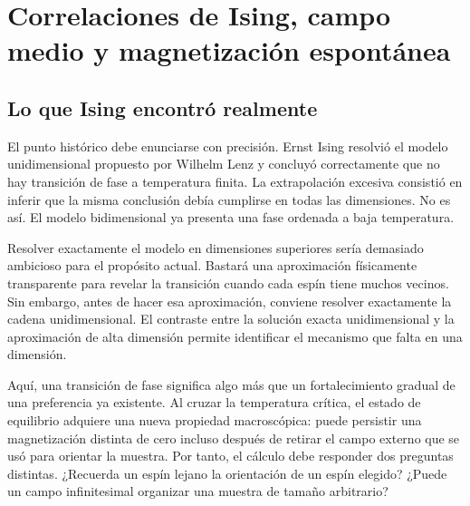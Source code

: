 \chapter{Correlaciones de Ising, campo medio y magnetización espontánea}


\section{Lo que Ising encontró realmente}

El punto histórico debe enunciarse con precisión. Ernst Ising resolvió el modelo unidimensional propuesto por Wilhelm Lenz y concluyó correctamente que no hay transición de fase a temperatura finita. La extrapolación excesiva consistió en inferir que la misma conclusión debía cumplirse en todas las dimensiones. No es así. El modelo bidimensional ya presenta una fase ordenada a baja temperatura.

Resolver exactamente el modelo en dimensiones superiores sería demasiado ambicioso para el propósito actual. Bastará una aproximación físicamente transparente para revelar la transición cuando cada espín tiene muchos vecinos. Sin embargo, antes de hacer esa aproximación, conviene resolver exactamente la cadena unidimensional. El contraste entre la solución exacta unidimensional y la aproximación de alta dimensión permite identificar el mecanismo que falta en una dimensión.

Aquí, una transición de fase significa algo más que un fortalecimiento gradual de una preferencia ya existente. Al cruzar la temperatura crítica, el estado de equilibrio adquiere una nueva propiedad macroscópica: puede persistir una magnetización distinta de cero incluso después de retirar el campo externo que se usó para orientar la muestra. Por tanto, el cálculo debe responder dos preguntas distintas. ¿Recuerda un espín lejano la orientación de un espín elegido? ¿Puede un campo infinitesimal organizar una muestra de tamaño arbitrario?

